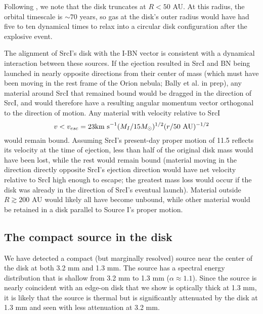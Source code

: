 \documentclass[twocolumn]{aastex61}
\newcommand{\sourcei}{SrcI\xspace}
\begin{document}
Following \citet{Bally2011a}, we note that the disk truncates at $R<50$
AU.  At this radius, the orbital timescale is $\sim70$ years, so gas at the
disk's outer radius would have had five to ten dynamical times to relax into a
circular disk configuration after the explosive event.

The alignment of \sourcei's disk with the I-BN vector is consistent with a
dynamical interaction between these sources.  If the ejection resulted in
\sourcei and BN being launched in nearly opposite directions from their center
of mass (which must have been moving in the rest frame of the Orion nebula; 
Bally et al. in prep), any material around \sourcei that remained bound would
be dragged in the direction of \sourcei, and would therefore have a resulting
angular momentum vector orthogonal to the direction of motion.  Any material
with
velocity relative to \sourcei 
$$v < v_{esc} = 23 \textrm{km~s}^{-1} (M_I/15M_{\odot})^{1/2}  (r/50~\mathrm{AU})^{-1/2}$$
would remain bound.
Assuming \sourcei's present-day proper motion of 11.5 \kms reflects its velocity
at the time of ejection, less than half of the original disk mass would
have been lost, while the rest would remain bound (material moving in the
direction directly opposite \sourcei's ejection direction would have net
velocity relative to \sourcei high enough to escape; the greatest mass
loss would occur if the disk was already in the direction of \sourcei's eventual
launch).
Material outside $R\gtrsim200$ AU would likely all have become unbound, while other
material would be retained in a disk parallel to Source I's proper motion.


\subsection{The compact source in the disk}
\label{sec:ptsrc}
We have detected a compact (but marginally resolved) source near the center of
the disk at both 3.2 mm and 1.3 mm.  The source has a spectral energy distribution
that is shallow from 3.2 mm to 1.3 mm ($\alpha\approx1.1$).  Since the source is nearly
coincident with an edge-on disk that we show is optically thick at 1.3 mm, it is
likely that the source is thermal but is significantly attenuated by the disk
at 1.3 mm and seen with less attenuation at 3.2 mm.
\end{document}
